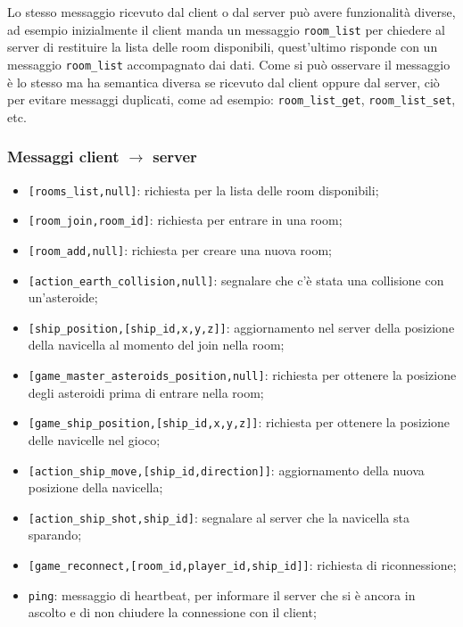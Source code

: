 \documentclass[paper=a4, fontsize=11pt]{scrartcl} %
\numberwithin{equation}{section} %
\numberwithin{figure}{section} %
\numberwithin{table}{section} %
\begin{document}
  Lo stesso messaggio ricevuto dal client o dal server può avere funzionalità diverse, ad esempio inizialmente il client manda un messaggio \texttt{room\_list} per chiedere al server di restituire la lista delle room disponibili, quest'ultimo risponde con un messaggio \texttt{room\_list} accompagnato dai dati. Come si può osservare il messaggio è lo stesso ma ha semantica diversa se ricevuto dal client oppure dal server, ciò per evitare messaggi duplicati, come ad esempio: \texttt{room\_list\_get}, \texttt{room\_list\_set}, etc.

\subsubsection{Messaggi client $\rightarrow$ server}
\begin{itemize}
\item \texttt{[rooms\_list,null]}: richiesta per la lista delle room disponibili;
\item \texttt{[room\_join,room\_id]}: richiesta per entrare in una room;
\item \texttt{[room\_add,null]}: richiesta per creare una nuova room;
\item \texttt{[action\_earth\_collision,null]}: segnalare che c'è stata una collisione con un'asteroide;
\item \texttt{[ship\_position,[ship\_id,x,y,z]]}: aggiornamento nel server della posizione della navicella al momento del join nella room;
\item \texttt{[game\_master\_asteroids\_position,null]}: richiesta per ottenere la posizione degli asteroidi prima di entrare nella room;
\item \texttt{[game\_ship\_position,[ship\_id,x,y,z]]}: richiesta per ottenere la posizione delle navicelle nel gioco;
\item \texttt{[action\_ship\_move,[ship\_id,direction]]}: aggiornamento della nuova posizione della navicella;
\item \texttt{[action\_ship\_shot,ship\_id]}: segnalare al server che la navicella sta sparando;
\item \texttt{[game\_reconnect,[room\_id,player\_id,ship\_id]]}: richiesta di riconnessione;
\item \texttt{ping}: messaggio di heartbeat, per informare il server che si è ancora in ascolto e di non chiudere la connessione con il client;
\end{itemize}
\end{document}
